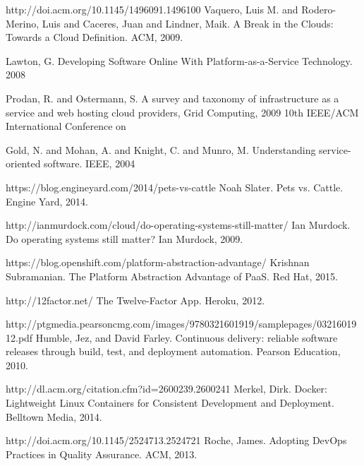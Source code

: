 \begin{thebibliography}{999}

%
%

http://doi.acm.org/10.1145/1496091.1496100
Vaquero, Luis M. and Rodero-Merino, Luis and Caceres, Juan and Lindner, Maik. A Break in the Clouds: Towards a Cloud Definition. ACM, 2009.

Lawton, G. Developing Software Online With Platform-as-a-Service Technology. 2008

Prodan, R. and Ostermann, S. A survey and taxonomy of infrastructure as a service and web hosting cloud providers, Grid Computing, 2009 10th IEEE/ACM International Conference on

Gold, N. and Mohan, A. and Knight, C. and Munro, M.  Understanding service-oriented software. IEEE, 2004

%
%

https://blog.engineyard.com/2014/pets-vs-cattle
Noah Slater. Pets vs. Cattle. Engine Yard, 2014.

http://ianmurdock.com/cloud/do-operating-systems-still-matter/
Ian Murdock. Do operating systems still matter? Ian Murdock, 2009.

https://blog.openshift.com/platform-abstraction-advantage/
Krishnan Subramanian. The Platform Abstraction Advantage of PaaS. Red Hat, 2015.

http://12factor.net/
The Twelve-Factor App. Heroku, 2012.

http://ptgmedia.pearsoncmg.com/images/9780321601919/samplepages/0321601912.pdf
Humble, Jez, and David Farley. Continuous delivery: reliable software releases through build, test, and deployment automation. Pearson Education, 2010.

http://dl.acm.org/citation.cfm?id=2600239.2600241
Merkel, Dirk. Docker: Lightweight Linux Containers for Consistent Development and Deployment. Belltown Media, 2014.

http://doi.acm.org/10.1145/2524713.2524721
Roche, James. Adopting DevOps Practices in Quality Assurance. ACM, 2013.


\end{thebibliography}
